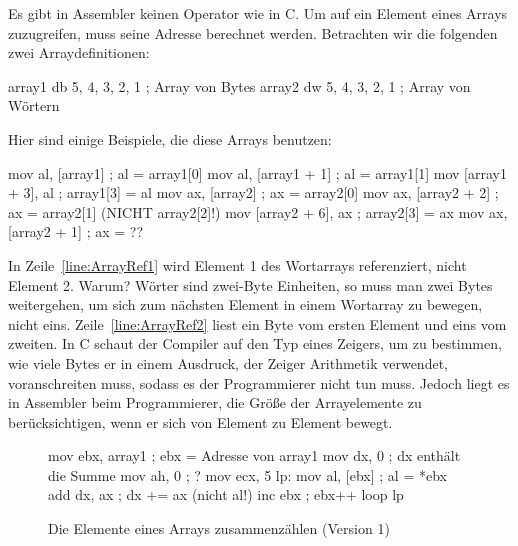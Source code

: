 Es gibt in Assembler keinen {\code [\,]} Operator wie in C\@. Um auf
ein Element eines Arrays zuzugreifen, muss seine Adresse berechnet
werden. Betrachten wir die folgenden zwei Arraydefinitionen:
\begin{AsmCodeListing}[frame=none, numbers=left, commandchars=\\\{\}]
 array1       db     5, 4, 3, 2, 1     ; Array von Bytes
 array2       dw     5, 4, 3, 2, 1     ; Array von W\"{o}rtern
\end{AsmCodeListing}
Hier sind einige Beispiele, die diese Arrays benutzen:
\begin{AsmCodeListing}[frame=none, numbers=left, firstnumber=last, commandchars=\\\{\}]
      mov    al, [array1]     ; al = array1[0]
      mov    al, [array1 + 1] ; al = array1[1]
      mov    [array1 + 3], al ; array1[3] = al
      mov    ax, [array2]     ; ax = array2[0]
      mov    ax, [array2 + 2] ; ax = array2[1] (NICHT array2[2]!)   \label{line:ArrayRef1}
      mov    [array2 + 6], ax ; array2[3] = ax
      mov    ax, [array2 + 1] ; ax = ??                             \label{line:ArrayRef2}
\end{AsmCodeListing}
In Zeile~\ref{line:ArrayRef1} wird Element 1 des Wortarrays
referenziert, nicht Element 2. Warum? W\"{o}rter sind zwei-Byte
Einheiten, so muss man zwei Bytes weitergehen, um sich zum n\"{a}chsten
Element in einem Wortarray zu bewegen, nicht eins.
Zeile~\ref{line:ArrayRef2} liest ein Byte vom ersten Element und
eins vom zweiten. In C schaut der Compiler auf den Typ eines
Zeigers, um zu bestimmen, wie viele Bytes er in einem Ausdruck, der
Zeiger Arithmetik verwendet, voranschreiten muss, sodass es der
Programmierer nicht tun muss. Jedoch liegt es in Assembler beim
Programmierer, die Gr\"{o}{\ss}e der Arrayelemente zu ber\"{u}cksichtigen, wenn
er sich von Element zu Element bewegt.

\begin{figure}[ht]
\begin{AsmCodeListing}[frame=single, numbers=left, commandchars=\\\{\}]
      mov    ebx, array1      ; ebx = Adresse von array1
      mov    dx, 0            ; dx enth\"{a}lt die Summe
      mov    ah, 0            ; ?                       \label{line:SumArray10}
      mov    ecx, 5
 lp:
      mov    al, [ebx]        ; al = *ebx               \label{line:SumArray11}
      add    dx, ax           ; dx += ax (nicht al!)    \label{line:SumArray12}
      inc    ebx              ; ebx++
      loop   lp
\end{AsmCodeListing}
\caption{Die Elemente eines Arrays zusammenz\"{a}hlen (Version 1)
\label{fig:SumArray1}}
\end{figure}

